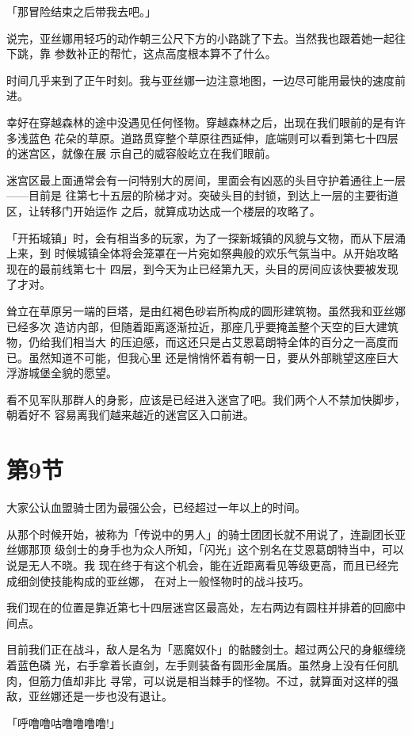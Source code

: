 \documentclass[11pt]{book}
\begin{document}
「那冒险结束之后带我去吧。」

说完，亚丝娜用轻巧的动作朝三公尺下方的小路跳了下去。当然我也跟着她一起往下跳，靠
参数补正的帮忙，这点高度根本算不了什么。

时间几乎来到了正午时刻。我与亚丝娜一边注意地图，一边尽可能用最快的速度前进。

幸好在穿越森林的途中没遇见任何怪物。穿越森林之后，出现在我们眼前的是有许多浅蓝色
花朵的草原。道路贯穿整个草原往西延伸，底端则可以看到第七十四层的迷宫区，就像在展
示自己的威容般屹立在我们眼前。

迷宫区最上面通常会有一问特别大的房间，里面会有凶恶的头目守护着通往上一层——目前是
往第七十五层的阶梯才对。突破头目的封锁，到达上一层的主要街道区，让转移门开始运作
之后，就算成功达成一个楼层的攻略了。

「开拓城镇」时，会有相当多的玩家，为了一探新城镇的风貌与文物，而从下层涌上来，到
时候城镇全体将会笼罩在一片宛如祭典般的欢乐气氛当中。从开始攻略现在的最前线第七十
四层，到今天为止已经第九天，头目的房间应该快要被发现了才对。

耸立在草原另一端的巨塔，是由红褐色砂岩所构成的圆形建筑物。虽然我和亚丝娜已经多次
造访内部，但随着距离逐渐拉近，那座几乎要掩盖整个天空的巨大建筑物，仍给我们相当大
的压迫感，而这还只是占艾恩葛朗特全体的百分之一高度而已。虽然知道不可能，但我心里
还是悄悄怀着有朝一日，要从外部眺望这座巨大浮游城堡全貌的愿望。

看不见军队那群人的身影，应该是已经进入迷宫了吧。我们两个人不禁加快脚步，朝着好不
容易离我们越来越近的迷宫区入口前进。
\section{第9节}
\label{sec:org116c763}
大家公认血盟骑士团为最强公会，已经超过一年以上的时间。

从那个时候开始，被称为「传说中的男人」的骑士团团长就不用说了，连副团长亚丝娜那顶
级剑士的身手也为众人所知，「闪光」这个别名在艾恩葛朗特当中，可以说是无人不晓。我
现在终于有这个机会，能在近距离看见等级更高，而且已经完成细剑使技能构成的亚丝娜，
在对上一般怪物时的战斗技巧。

我们现在的位置是靠近第七十四层迷宫区最高处，左右两边有圆柱并排着的回廊中间点。

目前我们正在战斗，敌人是名为「恶魔奴仆」的骷髅剑士。超过两公尺的身躯缠绕着蓝色磷
光，右手拿着长直剑，左手则装备有圆形金属盾。虽然身上没有任何肌肉，但筋力值却非比
寻常，可以说是相当棘手的怪物。不过，就算面对这样的强敌，亚丝娜还是一步也没有退让。

「呼噜噜咕噜噜噜噜!」
\end{document}
